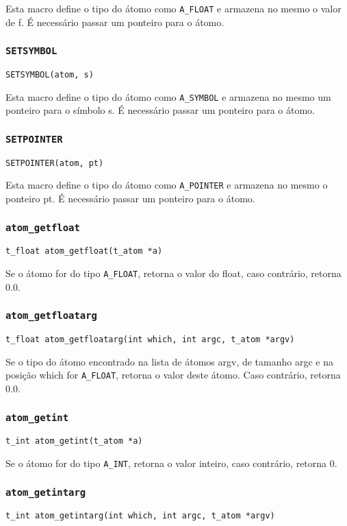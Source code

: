 Esta macro define o tipo do átomo como \texttt{A\_FLOAT} e armazena no mesmo o valor de f.
É necessário passar um ponteiro para o átomo.

\subsubsection{\texttt{SETSYMBOL}}
\texttt{SETSYMBOL(atom, s)}

Esta macro define o tipo do átomo como \texttt{A\_SYMBOL} e armazena no mesmo um ponteiro
para o símbolo s.
É necessário passar um ponteiro para o átomo.

\subsubsection{\texttt{SETPOINTER}}
\texttt{SETPOINTER(atom, pt)}

Esta macro define o tipo do átomo como \texttt{A\_POINTER} e armazena no mesmo o ponteiro
pt.
É necessário passar um ponteiro para o átomo.

\subsubsection{\texttt{atom\_getfloat}}
\texttt{t\_float atom\_getfloat(t\_atom *a)}

Se o átomo for do tipo \texttt{A\_FLOAT}, retorna o valor do float, caso contrário,
retorna 0.0.

\subsubsection{\texttt{atom\_getfloatarg}}
\texttt{t\_float atom\_getfloatarg(int which, int argc, t\_atom *argv)}

Se o tipo do átomo encontrado na lista de átomos argv, de tamanho argc e na
posição which for \texttt{A\_FLOAT}, retorna o valor deste átomo.
Caso contrário, retorna 0.0.

\subsubsection{\texttt{atom\_getint}}
\texttt{t\_int atom\_getint(t\_atom *a)}

Se o átomo for do tipo \texttt{A\_INT}, retorna o valor inteiro, caso contrário,
retorna 0.

\subsubsection{\texttt{atom\_getintarg}}
\texttt{t\_int atom\_getintarg(int which, int argc, t\_atom *argv)}

